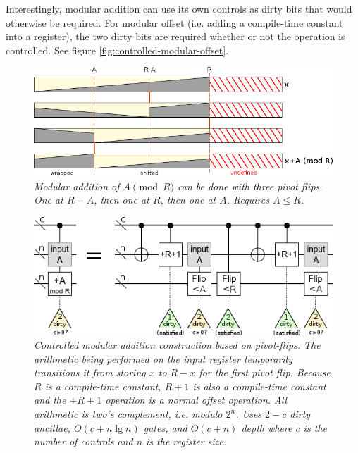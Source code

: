 \documentclass[twocolumn]{article}
\begin{document}
Interestingly, modular addition can use its own controls as dirty bits that would otherwise be required.
For modular offset (i.e. adding a compile-time constant into a register), the two dirty bits are required whether or not the operation is controlled.
See figure \ref{fig:controlled-modular-offset}.

\begin{figure}
  \centering
  \includegraphics[width=\linewidth]{assets/mod-add-from-pivot-flip-bars.png}
  \caption{\em
     Modular addition of $A \pmod{R}$ can be done with three pivot flips.
     One at $R-A$, then one at $R$, then one at $A$.
     Requires $A \leq R$.
   }
  \label{fig:mod-add-from-pivot-flip-bars}
\end{figure}

\begin{figure}
  \centering
  \includegraphics[width=\linewidth]{assets/controlled-modular-addition.png}
  \caption{\em
    Controlled modular addition construction based on pivot-flips.
    The arithmetic being performed on the input register temporarily transitions it from storing $x$ to $R-x$ for the first pivot flip.
    Because $R$ is a compile-time constant, $R+1$ is also a compile-time constant and the $+R+1$ operation is a normal offset operation.
    All arithmetic is two's complement, i.e. modulo $2^n$.
    Uses $2-c$ dirty ancillae, $O(c + n \lg n)$ gates, and $O(c + n)$ depth where $c$ is the number of controls and $n$ is the register size.
  }
  \label{fig:controlled-modular-add}
\end{figure}
\end{document}
